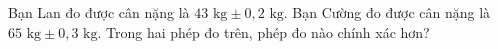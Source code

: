 \begin{ex}
Bạn Lan đo được cân nặng là $43\text{ kg}\pm0{,}2\text{ kg}$. Bạn Cường đo được cân nặng là $65\text{ kg}\pm0{,}3\text{ kg}$. Trong hai phép đo trên, phép đo nào chính xác hơn?
\end{ex}
